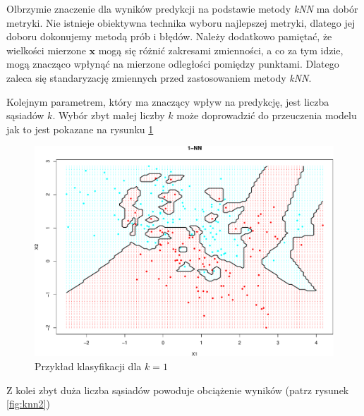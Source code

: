 \documentclass[]{book}
\theoremstyle{plain}
\theoremstyle{definition}
\theoremstyle{definition}
\theoremstyle{definition}
\theoremstyle{definition}
\theoremstyle{remark}
\begin{document}
Olbrzymie znaczenie dla wyników predykcji na podstawie metody \emph{kNN} ma dobór metryki. Nie istnieje obiektywna technika wyboru najlepszej metryki, dlatego jej doboru dokonujemy metodą prób i błędów. Należy dodatkowo pamiętać, że wielkości mierzone \(\boldsymbol x\) mogą się różnić zakresami zmienności, a co za tym idzie, mogą znacząco wpłynąć na mierzone odległości pomiędzy punktami. Dlatego zaleca się standaryzację zmiennych przed zastosowaniem metody \emph{kNN}.

Kolejnym parametrem, który ma znaczący wpływ na predykcję, jest liczba sąsiadów \(k\). Wybór zbyt małej liczby \(k\) może doprowadzić do przeuczenia modelu jak to jest pokazane na rysunku \ref{fig:knn1}

\begin{figure}

{\centering \includegraphics{EksploracjaDanych_files/figure-latex/knn1-1} 

}

\caption{Przykład klasyfikacji dla $k=1$}\label{fig:knn1}
\end{figure}

Z kolei zbyt duża liczba sąsiadów powoduje obciążenie wyników (patrz rysunek \ref{fig:knn2})
\end{document}
